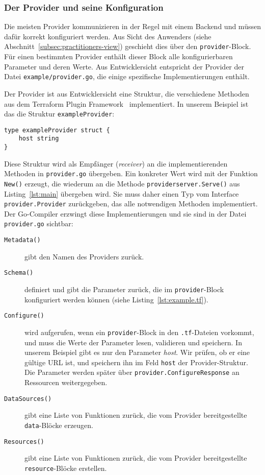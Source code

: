 \documentclass[paper=a4,11pt,numbers=noenddot]{article}
\begin{document}
\subsubsection{Der Provider und seine Konfiguration}
\label{subsubsec:base-prov-conf}

Die meisten Provider kommunizieren in der Regel mit einem Backend und müssen dafür korrekt konfiguriert werden. Aus Sicht des Anwenders (siehe Abschnitt~\ref{subsec:practitioners-view}) geschieht dies über den \verb'provider'-Block. Für einen bestimmten Provider enthält dieser Block alle konfigurierbaren Parameter und deren Werte. Aus Entwicklersicht entspricht der Provider der Datei \verb'example/provider.go', die einige spezifische Implementierungen enthält.

Der Provider ist aus Entwicklersicht eine Struktur, die verschiedene Methoden aus dem Terraform Plugin Framework~\autocite{noauthor_terraform_framework_nodate} implementiert. In unserem Beispiel ist das die Struktur \verb'exampleProvider':

\begin{lstlisting}
type exampleProvider struct {
	host string
}
\end{lstlisting}


Diese Struktur wird als Empfänger (\emph{receiver}) an die implementierenden Methoden in \verb'provider.go' übergeben. Ein konkreter Wert wird mit der Funktion \verb'New()' erzeugt, die wiederum an die Methode \verb'providerserver.Serve()' aus Listing~\ref{lst:main} übergeben wird. Sie muss daher einen Typ vom Interface \verb'provider.Provider' zurückgeben, das alle notwendigen Methoden implementiert. Der Go-Compiler erzwingt diese Implementierungen und sie sind in der Datei \verb'provider.go' sichtbar:

\begin{description}
\item[\texttt{Metadata()}] gibt den Namen des Providers zurück.
\item[\texttt{Schema()}] definiert und gibt die Parameter zurück, die im \verb'provider'-Block konfiguriert werden können (siehe Listing~\ref{lst:example.tf}).
\item[\texttt{Configure()}] wird aufgerufen, wenn ein \verb'provider'-Block in den \verb'.tf'-Dateien vorkommt, und muss die Werte der Parameter lesen, validieren und speichern. In unserem Beispiel gibt es nur den Parameter \emph{host}. Wir prüfen, ob er eine gültige URL ist, und speichern ihn im Feld \verb'host' der Provider-Struktur. Die Parameter werden später über \verb'provider.ConfigureResponse' an Ressourcen weitergegeben.
\item[\texttt{DataSources()}] gibt eine Liste von Funktionen zurück, die vom Provider bereitgestellte \verb'data'-Blöcke erzeugen.
\item[\texttt{Resources()}] gibt eine Liste von Funktionen zurück, die vom Provider bereitgestellte \verb'resource'-Blöcke erstellen.
\end{description}
\end{document}
